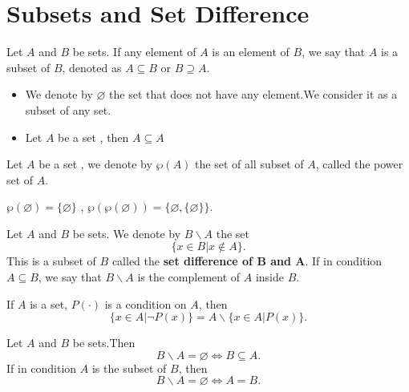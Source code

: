 \documentclass{book}
\numberwithin{equation}{section}
\begin{document}
\section{Subsets and Set Difference}
\begin{definitionenv}
    Let $A$ and $B$ be sets. If any element of $A$ is an element of $B$,  we say that $A$ is a subset of $B$, denoted as $A \subseteq B$ or $B\supseteq  A$.
\end{definitionenv}
\begin{exampleenv}
    \quad
   \begin{itemize}
    \item  We denote by $\varnothing $ the set that does not have any element.We consider it as a subset of any set.
   \item  Let $A$ be a set , then $A\subseteq A$
    \end{itemize}
\end{exampleenv}
\begin{definitionenv}
    Let $A$ be a set , we denote by $\wp  (A)$ the set of all subset of $A$,  called the power set of $A$.
\end{definitionenv}
\begin{exampleenv}
    $\wp (\varnothing)=\{\varnothing\}$
    , 
    $\wp (\wp (\varnothing))=\{\varnothing, \{\varnothing\}\}$.
\end{exampleenv}
\begin{definitionenv}
    Let $A$ and $B$ be sets. We denote by $B \backslash A$ the set $$\{x\in B|x\notin A\}.$$ This is a subset of $B$ called the \textbf{set difference of $\mathbf{B}$ and $\mathbf{A}$}.
    \newline
    If in condition $A \subseteq B$,  we say that $B\backslash A$ is the complement of $A$ inside $B$.
\end{definitionenv}
\begin{exampleenv}
    If $A$ is a set,  $P(\cdot)$ is  a condition on $A$,  then $$\{x\in A |\neg P(x)\}=A\backslash\{x\in A|P(x)\}.$$
\end{exampleenv}
\begin{propositionenv}
    Let $A$ and $B$ be sets.Then $$B\backslash A=\varnothing \Leftrightarrow B\subseteq A.$$
    If in condition $A$ is the subset of $B$,  then $$B\backslash A=\varnothing \Leftrightarrow A=B.$$
\end{propositionenv}
\end{document}
